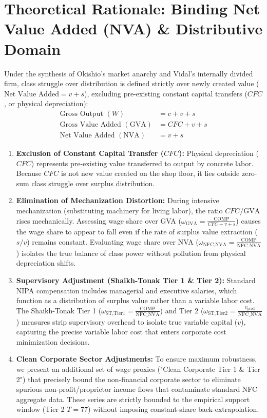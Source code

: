 \documentclass[11pt,a4paper]{article}
\begin{document}
\section*{Theoretical Rationale: Binding Net Value Added (NVA) \& Distributive Domain}
Under the synthesis of Okishio's market anarchy and Vidal's internally divided firm, class struggle over distribution is defined strictly over newly created value ($\text{Net Value Added} = v + s$), excluding pre-existing constant capital transfers ($CFC$, or physical depreciation):
\begin{align*}
\text{Gross Output } (W) &= c + v + s \\
\text{Gross Value Added } (\text{GVA}) &= CFC + v + s \\
\text{Net Value Added } (\text{NVA}) &= v + s
\end{align*}
\begin{enumerate}
    \item \textbf{Exclusion of Constant Capital Transfer ($CFC$):} Physical depreciation ($CFC$) represents pre-existing value transferred to output by concrete labor. Because $CFC$ is not new value created on the shop floor, it lies outside zero-sum class struggle over surplus distribution.
    \item \textbf{Elimination of Mechanization Distortion:} During intensive mechanization (substituting machinery for living labor), the ratio $CFC / \text{GVA}$ rises mechanically. Assessing wage share over GVA ($\omega_{\text{GVA}} = \frac{\text{COMP}}{CFC + v + s}$) causes the wage share to appear to fall even if the rate of surplus value extraction ($s/v$) remains constant. Evaluating wage share over NVA ($\omega_{\text{NFC,NVA}} = \frac{\text{COMP}}{\text{NFC\_NVA}}$) isolates the true balance of class power without pollution from physical depreciation shifts.
    \item \textbf{Supervisory Adjustment (Shaikh-Tonak Tier 1 \& Tier 2):} Standard NIPA compensation includes managerial and executive salaries, which function as a distribution of surplus value rather than a variable labor cost. The Shaikh-Tonak Tier 1 ($\omega_{\text{ST,Tier1}} = \frac{\text{COMP}}{\text{NFC\_NVA}}$) and Tier 2 ($\omega_{\text{ST,Tier2}} = \frac{v_{\text{prod}}}{\text{NFC\_NVA}}$) measures strip supervisory overhead to isolate true variable capital ($v$), capturing the precise variable labor cost that enters corporate cost minimization decisions.
    \item \textbf{Clean Corporate Sector Adjustments:} To ensure maximum robustness, we present an additional set of wage proxies ("Clean Corporate Tier 1 \& Tier 2") that precisely bound the non-financial corporate sector to eliminate spurious non-profit/proprietor income flows that contaminate standard NFC aggregate data. These series are strictly bounded to the empirical support window (Tier 2 $T=77$) without imposing constant-share back-extrapolation.
\end{enumerate}
\end{document}
